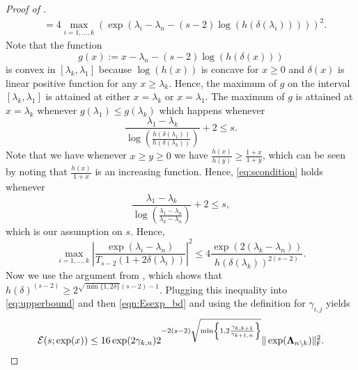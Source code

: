 \begin{appendices}
\begin{proof}[Proof of ]
\begin{align*}
        &= 4 \max\limits_{i=1,\ldots,k} \left(\exp(\lambda_i - \lambda_n - (s-2)\log(h(\delta(\lambda_i))))\right)^2.
    \end{align*}
    Note that the function 
    \begin{equation*}
        g(x) := x - \lambda_n - (s-2)\log(h(\delta(x)))
    \end{equation*}
    is convex in $[\lambda_k,\lambda_1]$ because $\log(h(x))$ is concave for $x \geq 0$ and $\delta(x)$ is linear positive function for any $x \geq \lambda_{k}$. Hence, the maximum of $g$ on the interval $[\lambda_k,\lambda_1]$ is attained at either $x = \lambda_k$ or $x = \lambda_1$. The maximum of $g$ is attained at $x = \lambda_k$ whenever $g(\lambda_1) \leq g(\lambda_k)$ which happens whenever
    \begin{equation}\label{eq:scondition}
        \frac{\lambda_1 - \lambda_k}{\log\left(\frac{h(\delta(\lambda_1))}{h(\delta(\lambda_k))}\right)} + 2 \leq s.
    \end{equation}
    Note that we have whenever $x \geq y \geq 0$ we have $\frac{h(x)}{h(y)} \geq \frac{1 + x}{1+y}$, which can be seen by noting that $\frac{h(x)}{1+x}$ is an increasing function. Hence, \eqref{eq:scondition} holds whenever
    \begin{equation*}
        \frac{\lambda_1 - \lambda_k}{\log\left(\frac{\lambda_1 - \lambda_{n}}{\lambda_k - \lambda_{n}}\right)} + 2  \leq s,
    \end{equation*}
    which is our assumption on $s$. Hence, 
    \begin{equation}\label{eq:upperbound}
         \max\limits_{i=1,\ldots,k} \left|\frac{\exp(\lambda_i-\lambda_{n})}{T_{s-2}\left(1 + 2 \delta(\lambda_i)\right)}\right|^2 \leq 4 \frac{\exp(2(\lambda_k - \lambda_n))}{h(\delta(\lambda_k))^{2(s-2)}}.
    \end{equation}
    Now we use the argument from \cite[p.21]{MM15}, which shows that $h(\delta)^{(s-2)} \geq 2^{\sqrt{\min\{1,2\delta\}}(s-2) - 1}$. Plugging this inequality into \cref{eq:upperbound} and then \cref{eqn:Esexp_bd} and  using the definition for $\gamma_{i,j}$ yields
    \begin{equation*}
        \mathcal{E}(s;\exp(x)) \leq 16 \exp(2\gamma_{k,n}) 2^{-2(s-2) \sqrt{\min\left\{1,2 \frac{\gamma_{k,k+1}}{\gamma_{k+1,n}}\right\}}} \|\exp(\bm{\Lambda}_{n\setminus k})\|_{\textsf{\textup{F}}}^2.
    \end{equation*}

\end{proof}
\end{appendices}
